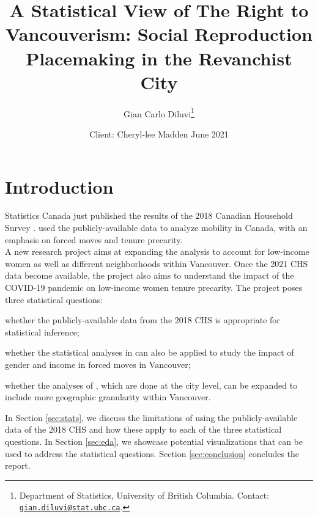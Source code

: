 \documentclass[11pt]{article}
\title{\vspace{-2cm}\Large A Statistical View of The Right to Vancouverism: Social Reproduction Placemaking in the Revanchist City}
\author{\normalsize Gian Carlo Diluvi\footnote{Department of Statistics, University of British Columbia. Contact: \href{mailto:gian.diluvi@stat.ubc.ca}{\texttt{gian.diluvi@stat.ubc.ca}}.}}
\date{\normalsize Client: Cheryl-lee Madden
\vskip 0.1cm
June 2021}
\begin{document}
\maketitle





\section{Introduction}

Statistics Canada just published the results of the 2018 Canadian
Household Survey \cite{chs2018}. \cite{blog} used the publicly-available
data to analyze mobility in Canada, with an emphasis on forced moves
and tenure precarity.
\\

A new research project aims at expanding the analysis \cite{blog}
to account for low-income women as well as different neighborhoods within
Vancouver. Once the 2021 CHS data become available, the project also aims
to understand the impact of the COVID-19 pandemic on low-income women
tenure precarity.
The project poses three statistical questions:
\benum
  \item whether the publicly-available data from the 2018 CHS is appropriate
  for statistical inference;
  \item whether the statistical analyses in \cite{blog} can also be applied
  to study the impact of gender and income in forced moves in Vancouver;
  \item whether the analyses of \cite{blog}, which are done at the city
  level, can be expanded to include more geographic granularity within Vancouver.
\eenum

In Section \ref{sec:stats}, we discuss the limitations of using the
publicly-available data of the 2018 CHS and how these apply to each
of the three statistical questions. In Section \ref{sec:eda}, we showcase
potential visualizations that can be used to address the statistical
questions. Section \ref{sec:conclusion} concludes the report.
\end{document}
